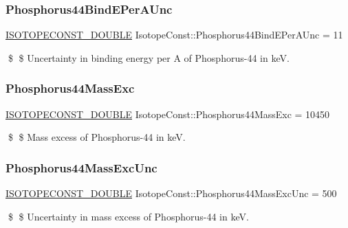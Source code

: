 \subsubsection{\texorpdfstring{Phosphorus44\+Bind\+E\+Per\+A\+Unc}{Phosphorus44BindEPerAUnc}}
{\footnotesize\ttfamily \mbox{\hyperlink{group___isotope_const-_macros_ga8f45a7272ce02c0b4c65c44636ed719a}{I\+S\+O\+T\+O\+P\+E\+C\+O\+N\+S\+T\+\_\+\+D\+O\+U\+B\+LE}} Isotope\+Const\+::\+Phosphorus44\+Bind\+E\+Per\+A\+Unc = 11}

\$ \$ Uncertainty in binding energy per A of Phosphorus-\/44 in keV. \mbox{\label{group___isotope_const-_phosphorus-_p44_ga8b946d3ce85d61e38b216a65373f3b81}} 
\subsubsection{\texorpdfstring{Phosphorus44\+Mass\+Exc}{Phosphorus44MassExc}}
{\footnotesize\ttfamily \mbox{\hyperlink{group___isotope_const-_macros_ga8f45a7272ce02c0b4c65c44636ed719a}{I\+S\+O\+T\+O\+P\+E\+C\+O\+N\+S\+T\+\_\+\+D\+O\+U\+B\+LE}} Isotope\+Const\+::\+Phosphorus44\+Mass\+Exc = 10450}

\$ \$ Mass excess of Phosphorus-\/44 in keV. \mbox{\label{group___isotope_const-_phosphorus-_p44_ga5c053b962feff02629de133b6f36537d}} 
\subsubsection{\texorpdfstring{Phosphorus44\+Mass\+Exc\+Unc}{Phosphorus44MassExcUnc}}
{\footnotesize\ttfamily \mbox{\hyperlink{group___isotope_const-_macros_ga8f45a7272ce02c0b4c65c44636ed719a}{I\+S\+O\+T\+O\+P\+E\+C\+O\+N\+S\+T\+\_\+\+D\+O\+U\+B\+LE}} Isotope\+Const\+::\+Phosphorus44\+Mass\+Exc\+Unc = 500}

\$ \$ Uncertainty in mass excess of Phosphorus-\/44 in keV. \mbox{\label{group___isotope_const-_phosphorus-_p44_gabb9f10bc98098a79ee463e62da0f572f}} 

